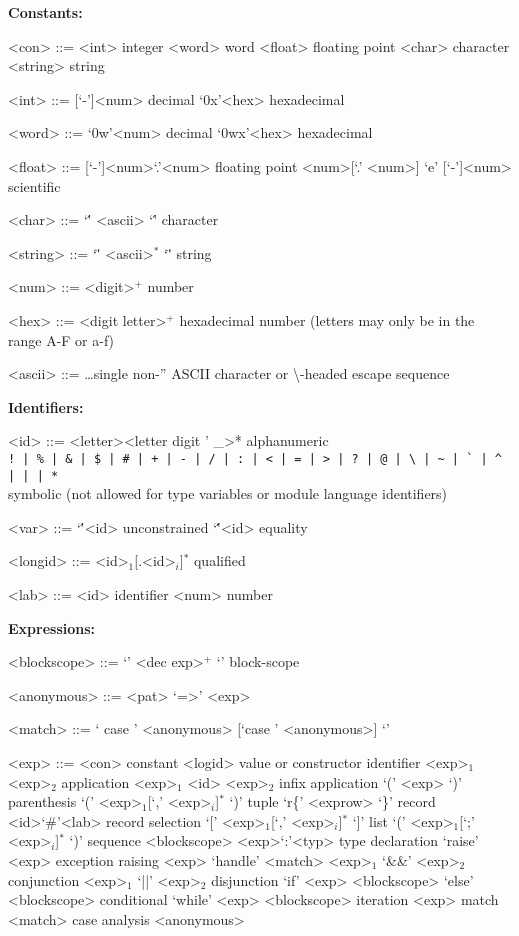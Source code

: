 \documentclass[11pt]{article}
\begin{document}
\textbf{Constants:}
\begin{grammar}
<con>	::= <int>	 integer
  \alt <word>	   word
  \alt <float>	   floating point
  \alt <char>	   character
  \alt <string>   string

<int>	::=	 [`-']<num>   decimal
  \alt [`-']`0x'<hex> hexadecimal

<word>	::=	`0w'<num>	 decimal
  \alt `0wx'<hex>	 hexadecimal

<float>	::=	 [`-']<num>`.'<num> floating point
  \alt <num>[`.' <num>] `e' [`-']<num>   	 scientific

<char>	::=	`\'' <ascii> `\''	character

<string>  	::=	`\"' <ascii>$^*$ `\"'	 string

<num>	::=	 <digit>$^+$	 number

<hex>	::=	 <digit \textbar letter>$^+$	 hexadecimal number (letters may only be in the range A-F or a-f)

<ascii>	::=	\dots single non-'' ASCII character or \textbackslash-headed escape sequence
\end{grammar}

\textbf{Identifiers:}
\begin{grammar}
<id>	::=  	<letter><letter \textbar digit \textbar ' \textbar \_>*	 alphanumeric \\
 \verb[! | % | & | $ | # | + | - | / | : | < | = | > | ? | @ | \ | ~ | ` | ^ | | | *[ \\   	 symbolic (not allowed for type variables or module language identifiers)

<var>	::=	`\''<id>	 unconstrained
\alt `\'\''<id>	 equality

<longid>   	::=	<id>$_1$[.<id>$_i$]$^*$	 qualified

<lab>	::=	<id>	 identifier
  \alt <num>	 number
\end{grammar}

\textbf{Expressions:}
\begin{grammar}
  <blockscope> ::= `{' <dec \textbar exp>$^+$ `}' block-scope

  <anonymous> ::= <pat> `=>' <exp>

  <match> ::= `{ case ' <anonymous> [\textbar `case ' <anonymous>] `}'

  <exp> ::= <con> constant
    \alt [op]<logid> value or constructor identifier
    \alt <exp>$_1$<exp>$_2$ application
    \alt <exp>$_1$ <id> <exp>$_2$ infix application
    \alt `(' <exp> `)' parenthesis
    \alt `(' <exp>$_1$[`,' <exp>$_i$]$^*$ `)' tuple
    \alt `r\{' <exprow> `\}' record
    \alt <id>`#'<lab> record selection
    \alt `[' <exp>$_1$[`,' <exp>$_i$]$^*$ `]' list
    \alt `(' <exp>$_1$[`;' <exp>$_i$]$^*$ `)' sequence
    \alt <blockscope>
    \alt <exp>`:'<typ> type declaration
    \alt `raise' <exp> exception raising
    \alt <exp> `handle' <match>
    \alt <exp>$_1$ `&&' <exp>$_2$ conjunction
    \alt <exp>$_1$ `||' <exp>$_2$ disjunction
    \alt `if' <exp> <blockscope> `else' <blockscope> conditional
    \alt `while' <exp> <blockscope> iteration
    \alt <exp> match <match> case analysis
    \alt <anonymous>
\end{grammar}
\end{document}
